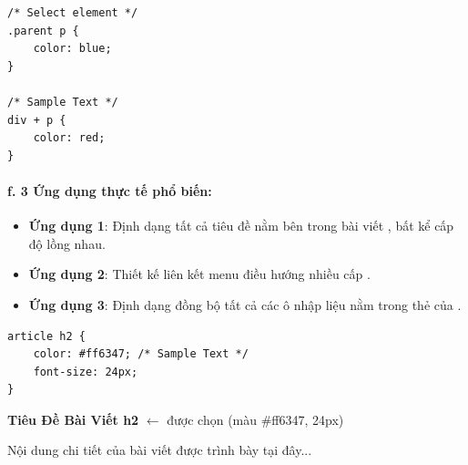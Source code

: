 \begin{codeWindow}
\begin{lstlisting}[language=CSS3]
/* Select element */
.parent p {
    color: blue;
}

/* Sample Text */
div + p {
    color: red;
}
\end{lstlisting}
\end{codeWindow}

\paragraph{f. 3 Ứng dụng thực tế phổ biến:}

\begin{tipBox}
\begin{itemize}[leftmargin=1.5em, itemsep=3pt, parsep=0pt]
    \item \textbf{Ứng dụng 1}: Định dạng tất cả tiêu đề  nằm bên trong bài viết , bất kể cấp độ lồng nhau.
    \item \textbf{Ứng dụng 2}: Thiết kế liên kết menu điều hướng nhiều cấp .
    \item \textbf{Ứng dụng 3}: Định dạng đồng bộ tất cả các ô nhập liệu  nằm trong thẻ  của .
\end{itemize}
\end{tipBox}

\begin{codeWindow}
\begin{lstlisting}[language=CSS3]
article h2 {
    color: #ff6347; /* Sample Text */
    font-size: 24px;
}
\end{lstlisting}
\end{codeWindow}

\begin{browserWindow}
\sffamily\small
\begin{tcolorbox}[arc=3pt, colback=white, colframe=gray!30, boxrule=1pt, title={\sffamily\scriptsize\color{darkText}<article> (Khối bài viết)}]
{\color{red!80!black}\bfseries\Large Tiêu Đề Bài Viết h2} {\small\textcolor{gray!60}{$\leftarrow$ được chọn (màu \#ff6347, 24px)}} \par\vspace{4pt}
\textcolor{darkText}{Nội dung chi tiết của bài viết được trình bày tại đây...}
\end{tcolorbox}
\end{browserWindow}


